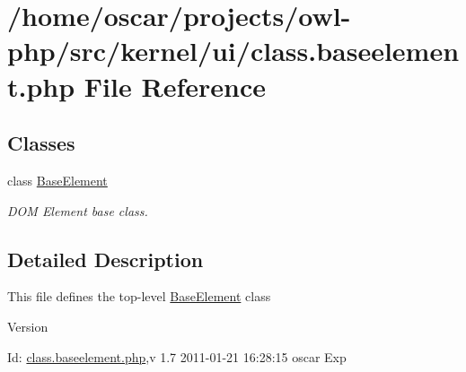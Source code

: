 \section{/home/oscar/projects/owl-\/php/src/kernel/ui/class.baseelement.php File Reference}
\label{class_8baseelement_8php}
\subsection*{Classes}
\begin{DoxyCompactItemize}
\item 
class \hyperlink{classBaseElement}{BaseElement}
\begin{DoxyCompactList}\small\item\em DOM Element base class. \item\end{DoxyCompactList}\end{DoxyCompactItemize}


\subsection{Detailed Description}
This file defines the top-\/level \hyperlink{classBaseElement}{BaseElement} class \begin{DoxyVersion}{Version}

\end{DoxyVersion}
\begin{DoxyParagraph}{Id:}
\hyperlink{class_8baseelement_8php}{class.baseelement.php},v 1.7 2011-\/01-\/21 16:28:15 oscar Exp 
\end{DoxyParagraph}

